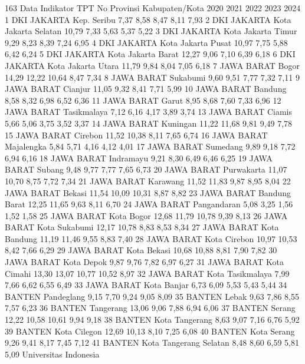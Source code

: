 163
Data Indikator TPT
No Provinsi Kabupaten/Kota 2020 2021 2022 2023 2024
1 DKI JAKARTA Kep. Seribu 7,37 8,58 8,47 8,11 7,93
2 DKI JAKARTA Kota Jakarta Selatan 10,79 7,33 5,63 5,37 5,22
3 DKI JAKARTA Kota Jakarta Timur 9,29 8,23 8,39 7,24 6,95
4 DKI JAKARTA Kota Jakarta Pusat 10,97 7,75 5,88 6,42 6,24
5 DKI JAKARTA Kota Jakarta Barat 12,27 9,06 7,10 6,39 6,18
6 DKI JAKARTA Kota Jakarta Utara 11,79 9,84 8,04 7,05 6,18
7 JAWA BARAT Bogor 14,29 12,22 10,64 8,47 7,34
8 JAWA BARAT Sukabumi 9,60 9,51 7,77 7,32 7,11
9 JAWA BARAT Cianjur 11,05 9,32 8,41 7,71 5,99
10 JAWA BARAT Bandung 8,58 8,32 6,98 6,52 6,36
11 JAWA BARAT Garut 8,95 8,68 7,60 7,33 6,96
12 JAWA BARAT Tasikmalaya 7,12 6,16 4,17 3,89 3,74
13 JAWA BARAT Ciamis 5,66 5,06 3,75 3,52 3,37
14 JAWA BARAT Kuningan 11,22 11,68 9,81 9,49 7,78
15 JAWA BARAT Cirebon 11,52 10,38 8,11 7,65 6,74
16 JAWA BARAT Majalengka 5,84 5,71 4,16 4,12 4,01
17 JAWA BARAT Sumedang 9,89 9,18 7,72 6,94 6,16
18 JAWA BARAT Indramayu 9,21 8,30 6,49 6,46 6,25
19 JAWA BARAT Subang 9,48 9,77 7,77 7,65 6,73
20 JAWA BARAT Purwakarta 11,07 10,70 8,75 7,72 7,34
21 JAWA BARAT Karawang 11,52 11,83 9,87 8,95 8,04
22 JAWA BARAT Bekasi 11,54 10,09 10,31 8,87 8,82
23 JAWA BARAT Bandung Barat 12,25 11,65 9,63 8,11 6,70
24 JAWA BARAT Pangandaran 5,08 3,25 1,56 1,52 1,58
25 JAWA BARAT Kota Bogor 12,68 11,79 10,78 9,39 8,13
26 JAWA BARAT Kota Sukabumi 12,17 10,78 8,83 8,53 8,34
27 JAWA BARAT Kota Bandung 11,19 11,46 9,55 8,83 7,40
28 JAWA BARAT Kota Cirebon 10,97 10,53 8,42 7,66 6,29
29 JAWA BARAT Kota Bekasi 10,68 10,88 8,81 7,90 7,82
30 JAWA BARAT Kota Depok 9,87 9,76 7,82 6,97 6,27
31 JAWA BARAT Kota Cimahi 13,30 13,07 10,77 10,52 8,97
32 JAWA BARAT Kota Tasikmalaya 7,99 7,66 6,62 6,55 6,49
33 JAWA BARAT Kota Banjar 6,73 6,09 5,53 5,43 5,44
34 BANTEN Pandeglang 9,15 7,70 9,24 9,05 8,09
35 BANTEN Lebak 9,63 7,86 8,55 7,57 6,23
36 BANTEN Tangerang 13,06 9,06 7,88 6,94 6,06
37 BANTEN Serang 12,22 10,58 10,61 9,94 9,18
38 BANTEN Kota Tangerang 8,63 9,07 7,16 6,76 5,92
39 BANTEN Kota Cilegon 12,69 10,13 8,10 7,25 6,08
40 BANTEN Kota Serang 9,26 9,41 8,17 7,45 7,12
41 BANTEN Kota Tangerang Selatan 8,48 8,60 6,59 5,81 5,09
Universitas Indonesia

